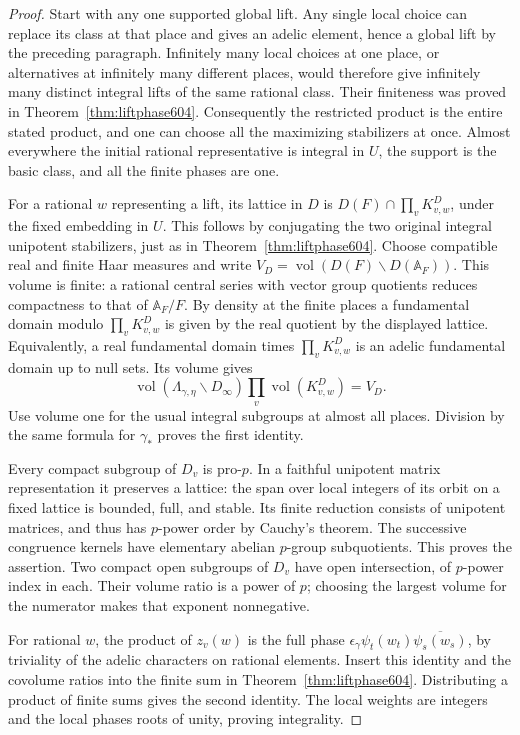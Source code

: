 \documentclass[a4paper,11pt]{article}
\theoremstyle{definition}
\theoremstyle{remark}
\numberwithin{equation}{section}
\begin{document}
\begin{proof}
Start with any one supported global lift. Any single local
choice can replace its class at that place and gives an
adelic element, hence a global lift by the preceding paragraph.
Infinitely many local choices at one place, or alternatives
at infinitely many different places, would therefore give
infinitely many distinct integral lifts of the same rational
class. Their finiteness was proved in
Theorem~\ref{thm:liftphase604}. Consequently the restricted
product is the entire stated product, and one can choose all
the maximizing stabilizers at once. Almost everywhere the
initial rational representative is integral in \(U\), the
support is the basic class, and all the finite phases are one.

For a rational \(w\) representing a lift, its lattice in \(D\)
is \(D(F)\cap\prod_v K^D_{v,w}\), under the fixed embedding
in \(U\). This follows by conjugating the two original integral
unipotent stabilizers, just as in Theorem~\ref{thm:liftphase604}.
Choose compatible real and finite Haar measures and write
\(V_D=\operatorname{vol}(D(F)\backslash D(\mathbb A_F))\).
This volume is finite: a rational central series with vector
group quotients reduces compactness to that of \(\mathbb A_F/F\).
By density at the finite places a fundamental domain modulo
\(\prod_v K^D_{v,w}\) is given by the real quotient by the
displayed lattice. Equivalently, a real fundamental domain
times \(\prod_v K^D_{v,w}\) is an adelic fundamental domain
up to null sets. Its volume gives
\[
  \operatorname{vol}(\Lambda_{\gamma,\eta}\backslash D_\infty)
                    \prod_v\operatorname{vol}(K^D_{v,w})=V_D .
\]
Use volume one for the usual integral subgroups at almost all
places. Division by the same formula for \(\gamma_*\) proves
the first identity.

Every compact subgroup of \(D_v\) is pro-\(p\). In a faithful
unipotent matrix representation it preserves a lattice:
the span over local integers of its orbit on a fixed lattice
is bounded, full, and stable. Its finite reduction consists
of unipotent matrices, and thus has \(p\)-power order by
Cauchy's theorem. The successive congruence kernels have
elementary abelian \(p\)-group subquotients. This proves the
assertion. Two compact open subgroups of \(D_v\) have open
intersection, of \(p\)-power index in each. Their volume ratio
is a power of \(p\); choosing the largest volume for the
numerator makes that exponent nonnegative.

For rational \(w\), the product of \(z_v(w)\) is the full phase
\(\epsilon_\gamma\psi_t(w_t)\overline{\psi_s(w_s)}\),
by triviality of the adelic characters on rational elements.
Insert this identity and the covolume ratios into the finite
sum in Theorem~\ref{thm:liftphase604}. Distributing a product
of finite sums gives the second identity. The local weights
are integers and the local phases roots of unity, proving
integrality.
\end{proof}
\end{document}
